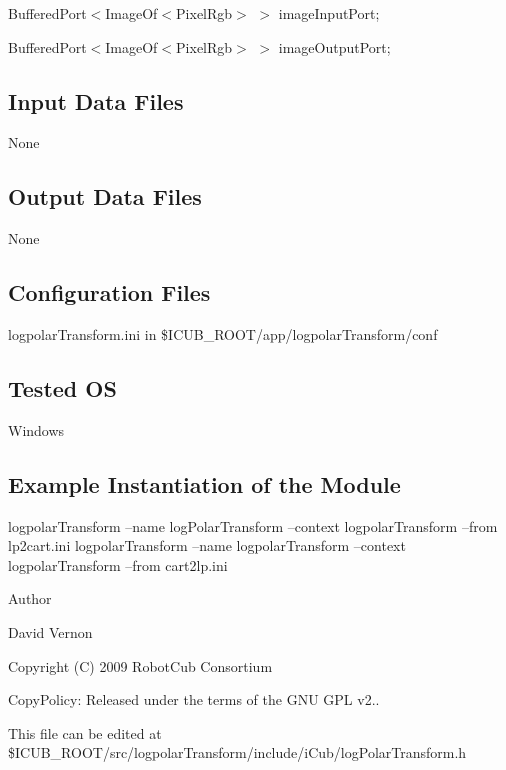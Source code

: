 \begin{DoxyItemize}
\item {\ttfamily Buffered\+Port$<$Image\+Of$<$\+Pixel\+Rgb$>$} $>$ {\ttfamily image\+Input\+Port};
\item {\ttfamily Buffered\+Port$<$Image\+Of$<$\+Pixel\+Rgb$>$} $>$ {\ttfamily image\+Output\+Port};
\end{DoxyItemize}\hypertarget{group__icub__logpolarTransform_in_files_sec}{}\subsection{Input Data Files}\label{group__icub__logpolarTransform_in_files_sec}
None\hypertarget{group__icub__logpolarTransform_out_data_sec}{}\subsection{Output Data Files}\label{group__icub__logpolarTransform_out_data_sec}
None\hypertarget{group__icub__logpolarTransform_conf_file_sec}{}\subsection{Configuration Files}\label{group__icub__logpolarTransform_conf_file_sec}
{\ttfamily logpolar\+Transform.\+ini} in {\ttfamily \$\+I\+C\+U\+B\+\_\+\+R\+O\+O\+T/app/logpolar\+Transform/conf} \hypertarget{group__icub__logpolarTransform_tested_os_sec}{}\subsection{Tested O\+S}\label{group__icub__logpolarTransform_tested_os_sec}
Windows\hypertarget{group__icub__logpolarTransform_example_sec}{}\subsection{Example Instantiation of the Module}\label{group__icub__logpolarTransform_example_sec}
{\ttfamily logpolar\+Transform --name log\+Polar\+Transform --context logpolar\+Transform --from lp2cart.\+ini } {\ttfamily logpolar\+Transform --name logpolar\+Transform --context logpolar\+Transform --from cart2lp.\+ini }

\begin{DoxyAuthor}{Author}

\end{DoxyAuthor}
David Vernon

Copyright (C) 2009 Robot\+Cub Consortium

Copy\+Policy\+: Released under the terms of the G\+N\+U G\+P\+L v2..

This file can be edited at \$\+I\+C\+U\+B\+\_\+\+R\+O\+O\+T/src/logpolar\+Transform/include/i\+Cub/log\+Polar\+Transform.h 